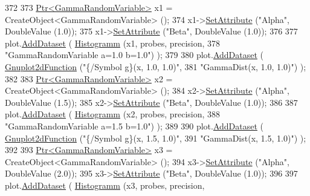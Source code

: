 \begin{DoxyCode}
372 
373     \hyperlink{classns3_1_1Ptr}{Ptr<GammaRandomVariable>} x1 = CreateObject<GammaRandomVariable> ();
374     x1->\hyperlink{classns3_1_1ObjectBase_ac60245d3ea4123bbc9b1d391f1f6592f}{SetAttribute} (\textcolor{stringliteral}{"Alpha"}, DoubleValue (1.0));
375     x1->\hyperlink{classns3_1_1ObjectBase_ac60245d3ea4123bbc9b1d391f1f6592f}{SetAttribute} (\textcolor{stringliteral}{"Beta"}, DoubleValue (1.0));
376 
377     plot.\hyperlink{classns3_1_1Gnuplot_a306ec724a327cf9ab699700f31fca0a1}{AddDataset} ( \hyperlink{main-random-variable-stream_8cc_a2cfd3837ab3f2e816cf53486d7a186b5}{Histogramm} (x1, probes, precision,
378                                   \textcolor{stringliteral}{"GammaRandomVariable a=1.0 b=1.0"}) );
379 
380     plot.\hyperlink{classns3_1_1Gnuplot_a306ec724a327cf9ab699700f31fca0a1}{AddDataset} ( \hyperlink{classns3_1_1Gnuplot2dFunction}{Gnuplot2dFunction} (\textcolor{stringliteral}{"\{/Symbol g\}(x, 1.0, 1.0)"},
381                                          \textcolor{stringliteral}{"GammaDist(x, 1.0, 1.0)"}) );
382 
383     \hyperlink{classns3_1_1Ptr}{Ptr<GammaRandomVariable>} x2 = CreateObject<GammaRandomVariable> ();
384     x2->\hyperlink{classns3_1_1ObjectBase_ac60245d3ea4123bbc9b1d391f1f6592f}{SetAttribute} (\textcolor{stringliteral}{"Alpha"}, DoubleValue (1.5));
385     x2->\hyperlink{classns3_1_1ObjectBase_ac60245d3ea4123bbc9b1d391f1f6592f}{SetAttribute} (\textcolor{stringliteral}{"Beta"}, DoubleValue (1.0));
386 
387     plot.\hyperlink{classns3_1_1Gnuplot_a306ec724a327cf9ab699700f31fca0a1}{AddDataset} ( \hyperlink{main-random-variable-stream_8cc_a2cfd3837ab3f2e816cf53486d7a186b5}{Histogramm} (x2, probes, precision,
388                                   \textcolor{stringliteral}{"GammaRandomVariable a=1.5 b=1.0"}) );
389 
390     plot.\hyperlink{classns3_1_1Gnuplot_a306ec724a327cf9ab699700f31fca0a1}{AddDataset} ( \hyperlink{classns3_1_1Gnuplot2dFunction}{Gnuplot2dFunction} (\textcolor{stringliteral}{"\{/Symbol g\}(x, 1.5, 1.0)"},
391                                          \textcolor{stringliteral}{"GammaDist(x, 1.5, 1.0)"}) );
392 
393     \hyperlink{classns3_1_1Ptr}{Ptr<GammaRandomVariable>} x3 = CreateObject<GammaRandomVariable> ();
394     x3->\hyperlink{classns3_1_1ObjectBase_ac60245d3ea4123bbc9b1d391f1f6592f}{SetAttribute} (\textcolor{stringliteral}{"Alpha"}, DoubleValue (2.0));
395     x3->\hyperlink{classns3_1_1ObjectBase_ac60245d3ea4123bbc9b1d391f1f6592f}{SetAttribute} (\textcolor{stringliteral}{"Beta"}, DoubleValue (1.0));
396 
397     plot.\hyperlink{classns3_1_1Gnuplot_a306ec724a327cf9ab699700f31fca0a1}{AddDataset} ( \hyperlink{main-random-variable-stream_8cc_a2cfd3837ab3f2e816cf53486d7a186b5}{Histogramm} (x3, probes, precision,

\end{DoxyCode}
